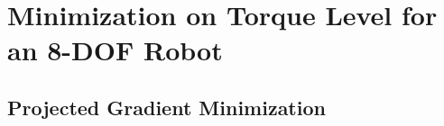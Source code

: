 \chapter{Minimization on Torque Level for an 8-DOF Robot}
\label{ch:control}





\section{Projected Gradient Minimization}
\label{sec:Gradientbasedminimization}


% 
% 
